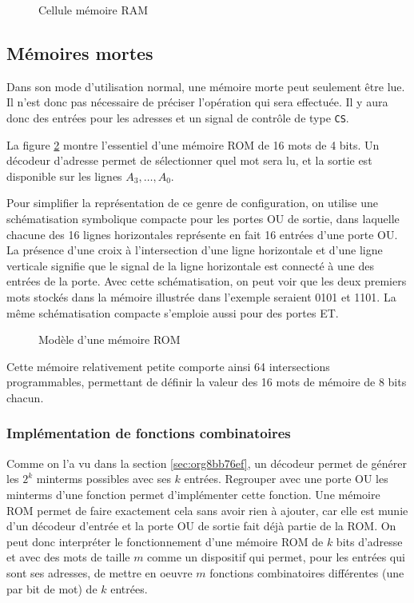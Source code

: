 \documentclass[11pt]{article}
\begin{document}
\begin{figure}[htbp]
\centering

\caption{\label{fig:orga5f4257}Cellule mémoire RAM}
\end{figure}


\subsection{Mémoires mortes}
\label{sec:orgcb039b2}

Dans son mode d'utilisation normal, une mémoire morte peut seulement
être lue. Il n'est donc pas nécessaire de préciser l'opération qui
sera effectuée. Il y aura donc des entrées pour les adresses et un
signal de contrôle de type \texttt{CS}.

La figure \ref{fig:org1bb51b4} montre l'essentiel d'une mémoire ROM de
16 mots de 4 bits. Un décodeur d'adresse permet de sélectionner quel
mot sera lu, et la sortie est disponible sur les lignes \(A_3, \ldots,
A_0\). 

Pour simplifier la représentation de ce genre de configuration, on
utilise une schématisation symbolique compacte pour les portes OU de
sortie, dans laquelle chacune des 16 lignes horizontales représente en
fait 16 entrées d'une porte OU. La présence d'une croix à
l'intersection d'une ligne horizontale et d'une ligne verticale
signifie que le signal de la ligne horizontale est connecté à une des
entrées de la porte.  Avec cette schématisation, on peut voir que les
deux premiers mots stockés dans la mémoire illustrée dans l'exemple
seraient 0101 et 1101. La même schématisation compacte s'emploie aussi
pour des portes ET.


\begin{figure}[htbp]
\centering

\caption{\label{fig:org1bb51b4}Modèle d'une mémoire ROM}
\end{figure}

Cette mémoire relativement petite comporte ainsi 64 intersections
programmables, permettant de définir la valeur des 16 mots de mémoire
de 8 bits chacun.

\subsubsection{Implémentation de fonctions combinatoires}
\label{sec:org16ff384}

Comme on l'a vu dans la section \ref{sec:org8bb76ef}, un décodeur permet de
générer les \(2^k\) minterms possibles avec ses \(k\)
entrées. Regrouper avec une porte OU les minterms d'une
fonction permet d'implémenter cette fonction. Une mémoire ROM permet
de faire exactement cela sans avoir rien à ajouter, car elle est munie
d'un décodeur d'entrée et la porte OU de sortie fait déjà partie de
la ROM. On peut donc interpréter le fonctionnement d'une mémoire ROM
de \(k\) bits d'adresse et avec des mots de taille \(m\) comme un
dispositif qui permet, pour les entrées qui sont ses adresses, de
mettre en oeuvre \(m\) fonctions combinatoires différentes (une par
bit de mot) de \(k\) entrées.
\end{document}

